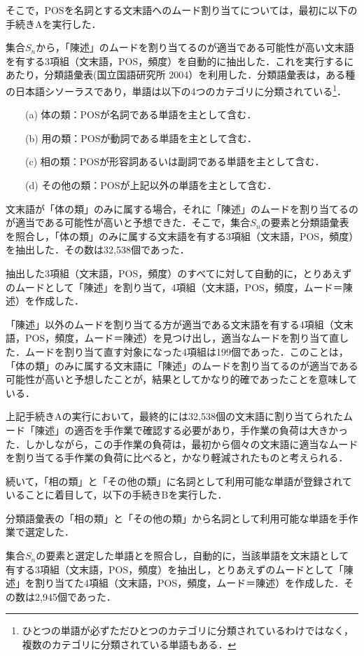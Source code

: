 \documentclass[japanese]{jnlp_1.4}
\newcommand{\InH}[1]{}
\begin{document}
そこで，POSを名詞とする文末語へのムード割り当てについては，最初に以下の手続きAを実行した．

\InH{(A-1)}
集合$S_{n}$から，「陳述」のムードを割り当てるのが適当である可能性が高い文末語を有する3項組（文末語，POS，頻度）を自動的に抽出した．これを実行するにあたり，分類語彙表(国立国語研究所 
2004）を利用した．分類語彙表は，ある種の日本語シソーラスであり，単語は以下の4つのカテゴリに分類されている\footnote{
	ひとつの単語が必ずただひとつのカテゴリに分類されているわけではなく，
	複数のカテゴリに分類されている単語もある．}．

　　(a) 体の類：POSが名詞である単語を主として含む．

　　(b) 用の類：POSが動詞である単語を主として含む．

　　(c) 相の類：POSが形容詞あるいは副詞である単語を主として含む．

　　(d) その他の類：POSが上記以外の単語を主として含む．

文末語が「体の類」のみに属する場合，それに「陳述」のムードを割り当てるのが適当である可能性が高いと予想できた．そこで，集合$S_{n}$の要素と分類語彙表を照合し，「体の類」のみに属する文末語を有する3項組（文末語，POS，頻度）を抽出した．その数は32,538個であった．

\InH{(A-2)}
抽出した3項組（文末語，POS，頻度）のすべてに対して自動的に，とりあえずのムードとして「陳述」を割り当て，4項組（文末語，POS，頻度，ムード＝陳述）を作成した．

\InH{(A-3)}
「陳述」以外のムードを割り当てる方が適当である文末語を有する4項組（文末語，POS，頻度，ムード＝陳述）を見つけ出し，適当なムードを割り当て直した．ムードを割り当て直す対象になった4項組は199個であった．このことは，「体の類」のみに属する文末語に「陳述」のムードを割り当てるのが適当である可能性が高いと予想したことが，結果としてかなり的確であったことを意味している．

上記手続きAの実行において，最終的には32,538個の文末語に割り当てられたムード「陳述」の適否を手作業で確認する必要があり，手作業の負荷は大きかった．しかしながら，この手作業の負荷は，最初から個々の文末語に適当なムードを割り当てる手作業の負荷に比べると，かなり軽減されたものと考えられる．

続いて，「相の類」と「その他の類」に名詞として利用可能な単語が登録されていることに着目して，以下の手続きBを実行した．

\InH{(B-1)}
分類語彙表の「相の類」と「その他の類」から名詞として利用可能な単語を手作業で選定した．

\InH{(B-2)}
集合$S_{n}$の要素と選定した単語とを照合し，自動的に，当該単語を文末語として有する3項組（文末語，POS，頻度）を抽出し，とりあえずのムードとして「陳述」を割り当てた4項組（文末語，POS，頻度，ムード＝陳述）を作成した．その数は2,945個であった．
\end{document}
